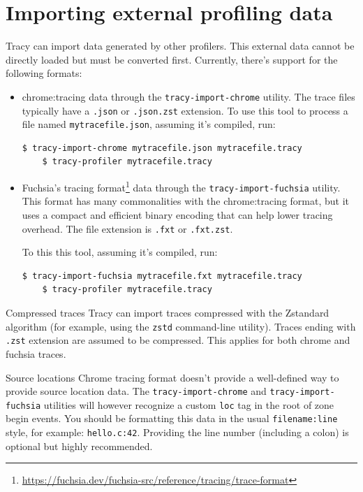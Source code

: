 \documentclass[hidelinks,titlepage,a4paper,twoside]{article}
\begin{document}
\section{Importing external profiling data}
\label{importingdata}

Tracy can import data generated by other profilers. This external data cannot be directly loaded but must be converted first.
Currently, there's support for the following formats:
\begin{itemize}
  \item chrome:tracing data through the \texttt{tracy-import-chrome} utility. The trace files
    typically have a \texttt{.json} or \texttt{.json.zst} extension.
    To use this tool to process a file named \texttt{mytracefile.json}, assuming it's compiled, run:
    \begin{lstlisting}[language=sh]
    $ tracy-import-chrome mytracefile.json mytracefile.tracy
    $ tracy-profiler mytracefile.tracy
    \end{lstlisting}
  \item Fuchsia's tracing format\footnote{\url{https://fuchsia.dev/fuchsia-src/reference/tracing/trace-format}}
    data through the \texttt{tracy-import-fuchsia} utility.
    This format has many commonalities with the chrome:tracing format, but it uses a
    compact and efficient binary encoding that can help lower tracing overhead.
    The file extension is \texttt{.fxt} or \texttt{.fxt.zst}.

    To this this tool, assuming it's compiled, run:
    \begin{lstlisting}[language=sh]
    $ tracy-import-fuchsia mytracefile.fxt mytracefile.tracy
    $ tracy-profiler mytracefile.tracy
    \end{lstlisting}
\end{itemize}

\begin{bclogo}[
noborder=true,
couleur=black!5,
logo=\bclampe
]{Compressed traces}
Tracy can import traces compressed with the Zstandard algorithm (for example, using the \texttt{zstd} command-line utility). Traces ending with \texttt{.zst} extension are assumed to be compressed.
This applies for both chrome and fuchsia traces.
\end{bclogo}

\begin{bclogo}[
noborder=true,
couleur=black!5,
logo=\bclampe
]{Source locations}
Chrome tracing format doesn't provide a well-defined way to provide source location data.
  The \texttt{tracy-import-chrome} and \texttt{tracy-import-fuchsia} utilities will however recognize a custom \texttt{loc} tag in the root of zone begin events. You should be formatting this data in the usual \texttt{filename:line} style, for example: \texttt{hello.c:42}. Providing the line number (including a colon) is optional but highly recommended.
\end{bclogo}
\end{document}
